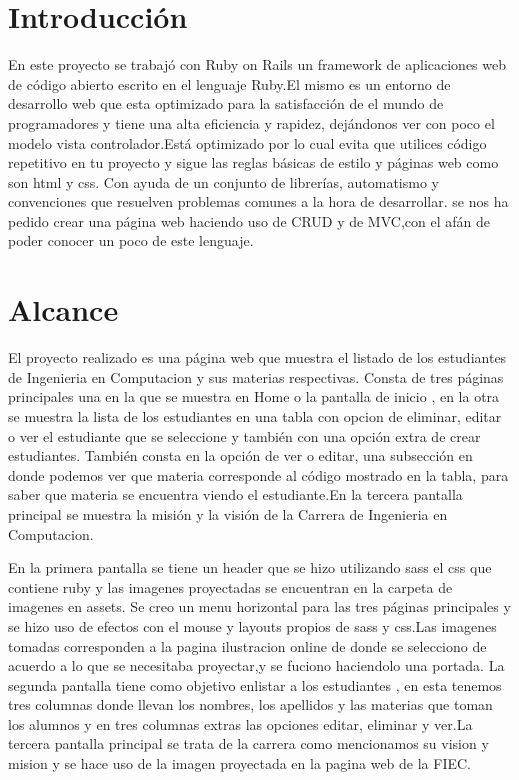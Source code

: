 \section{Introducción}
En este proyecto se trabajó con Ruby on Rails un framework de aplicaciones web de código abierto escrito en el lenguaje Ruby.El mismo es un entorno de desarrollo web que esta optimizado para la satisfacción de el mundo de programadores y tiene una alta eficiencia y rapidez, dejándonos ver con poco el modelo vista controlador.Está optimizado por lo cual evita que utilices código repetitivo en tu proyecto y sigue las reglas básicas de estilo y páginas web como son html y css.
Con ayuda de un conjunto de librerías, automatismo y convenciones que resuelven problemas comunes a la hora de desarrollar. se nos ha pedido crear una página web haciendo uso de CRUD y de MVC,con el afán de poder conocer un poco de este lenguaje.

\section{Alcance}
El proyecto realizado es una página web que muestra el listado de los estudiantes de Ingenieria en Computacion y sus materias respectivas. Consta de tres páginas principales una en la que se muestra en Home o la pantalla de inicio , en la otra se muestra la lista de los estudiantes en una tabla con opcion de eliminar, editar o ver el estudiante que se seleccione y también con una opción extra de crear estudiantes. También consta en la opción de ver o editar, una subsección en donde podemos ver que materia corresponde al código mostrado en la tabla, para saber que materia se encuentra viendo el estudiante.En la tercera pantalla principal se muestra la misión y la visión de la Carrera de Ingenieria en Computacion.

En la primera pantalla se tiene un header que se hizo utilizando sass el css que contiene ruby y las imagenes proyectadas se encuentran en la carpeta de imagenes en assets. Se creo un menu horizontal para las tres páginas principales y se hizo uso de efectos con el mouse y layouts propios de sass y css.Las imagenes tomadas corresponden a la pagina ilustracion online de donde se selecciono de acuerdo a lo que se necesitaba proyectar,y se fuciono haciendolo una portada. La segunda pantalla tiene como objetivo enlistar a los estudiantes , en esta tenemos tres columnas donde llevan los nombres, los apellidos y las materias que toman los alumnos y en tres columnas extras las opciones editar, eliminar y ver.La tercera pantalla principal se trata de la carrera como mencionamos su vision y mision y se hace uso de la imagen proyectada en la pagina web de la FIEC.


